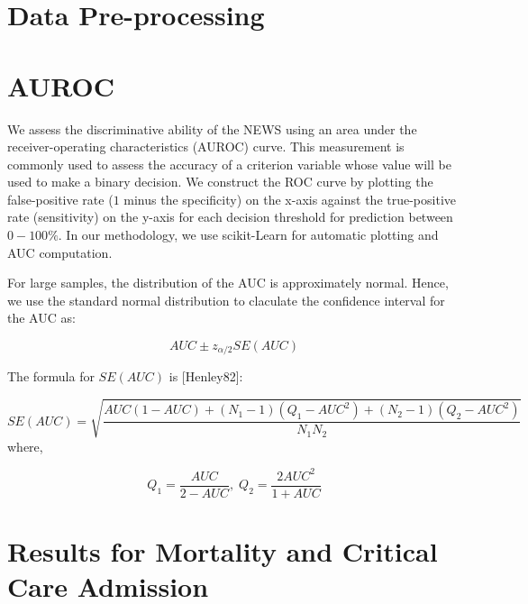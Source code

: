 \documentclass[10pt,journal, compsoc]{IEEEtran}
\begin{document}
\onecolumn
\appendices

\section{Data Pre-processing}
\label{appendix:preprocessing}

\section{AUROC}
\label{appendix:auroc}
We assess the discriminative ability of the NEWS using an area under the receiver-operating characteristics (AUROC) curve. This measurement is commonly used to assess the accuracy of a criterion variable whose value will be used to make a binary decision. We construct the ROC curve by plotting the false-positive rate ($1$ minus the specificity) on the x-axis against the true-positive rate (sensitivity) on the y-axis for each decision threshold for prediction between $0-100\%$. In our methodology, we use scikit-Learn for automatic plotting and AUC computation.

For large samples, the distribution of the AUC is approximately normal. Hence, we use the standard normal distribution to claculate the confidence interval for the AUC as:

\begin{equation}
    AUC \pm z_{\alpha/2}SE(AUC)
\end{equation}

The formula for $SE(AUC)$ is [Henley82]:

\begin{equation}
    SE(AUC) = \sqrt{\frac{AUC(1-AUC) + (N_1-1)(Q_1-AUC^2) + (N_2-1)(Q_2-AUC^2)}{N_1N_2}}
\end{equation}
where,

\begin{equation}
    Q_1 = \frac{AUC}{2-AUC}, \;
    Q_2 = \frac{2AUC^2}{1+AUC}
\end{equation}

\section{Results for Mortality and Critical Care Admission}
\label{appendix:criticalevent_breakdown}
\end{document}
